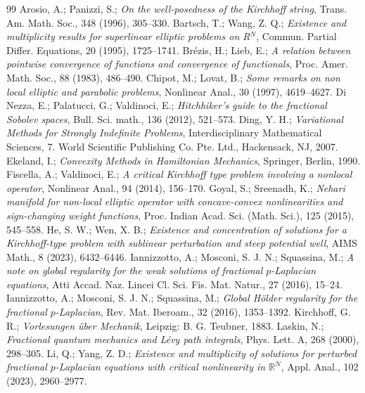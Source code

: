 \documentclass[10pt,a4paper]{amsart}
\numberwithin{equation}{section}
\begin{document}
\begin{thebibliography}{99}
 Arosio, A.; Panizzi, S.; \emph{On the well-posedness of the Kirchhoff string}, Trans. Am. Math. Soc., 348 (1996), 305--330.
 Bartsch, T.; Wang, Z. Q.; \emph{Existence and multiplicity results for superlinear elliptic problems on R$^N$}, Commun. Partial Differ. Equations, 20 (1995), 1725--1741.
 Br\'{e}zis, H.; Lieb, E.; \emph{A relation between pointwise convergence of functions and convergence of functionals}, Proc. Amer. Math. Soc., 88 (1983), 486--490.
 Chipot, M.; Lovat, B.; \emph{Some remarks on non local elliptic and parabolic problems}, Nonlinear Anal., 30 (1997), 4619--4627.
 Di Nezza, E.; Palatucci, G.; Valdinoci, E.; \emph{Hitchhiker's guide to the fractional Sobolev spaces}, Bull. Sci. math., 136 (2012), 521--573.
 Ding, Y. H.; \emph{Variational Methods for Strongly Indefinite Problems}, Interdisciplinary Mathematical Sciences, 7. World Scientific Publishing Co. Pte. Ltd., Hackensack, NJ, 2007.
 Ekeland, I.; \emph{Convexity Methods in Hamiltonian Mechanics}, Springer, Berlin, 1990.
 Fiscella, A.; Valdinoci, E.; \emph{A critical Kirchhoff type problem involving a nonlocal operator}, Nonlinear Anal., 94 (2014), 156--170.
 Goyal, S.; Sreenadh, K.; \emph{Nehari manifold for non-local elliptic operator with concave-convex nonlinearities and sign-changing weight functions}, Proc. Indian Acad. Sci. (Math. Sci.), 125 (2015), 545--558.
 He, S. W.; Wen, X. B.; \emph{Existence and concentration of solutions for a Kirchhoff-type problem with sublinear perturbation and steep potential well}, AIMS Math., 8 (2023), 6432--6446.
 Iannizzotto, A.; Mosconi, S. J. N.; Squassina, M.; \emph{A note on global regularity for the weak solutions of fractional $p$-Laplacian equations}, Atti Accad. Naz. Lincei Cl. Sci. Fis. Mat. Natur., 27 (2016), 15--24.
 Iannizzotto, A.; Mosconi, S. J. N.; Squassina, M.; \emph{Global H\"{o}lder regularity for the fractional $p$-Laplacian}, Rev. Mat. Iberoam., 32 (2016), 1353--1392.
 Kirchhoff, G. R.; \emph{Vorlesungen \"{u}ber Mechanik}, Leipzig: B. G. Teubner, 1883.
 Laskin, N.; \emph{Fractional quantum mechanics and L\'{e}vy path integrals}, Phys. Lett. A, 268 (2000), 298--305.
 Li, Q.; Yang, Z. D.; \emph{Existence and multiplicity of solutions for perturbed fractional $p$-Laplacian equations with critical nonlinearity in $\mathbb{R}^N$}, Appl. Anal., 102 (2023), 2960--2977.

\end{thebibliography}
\end{document}
